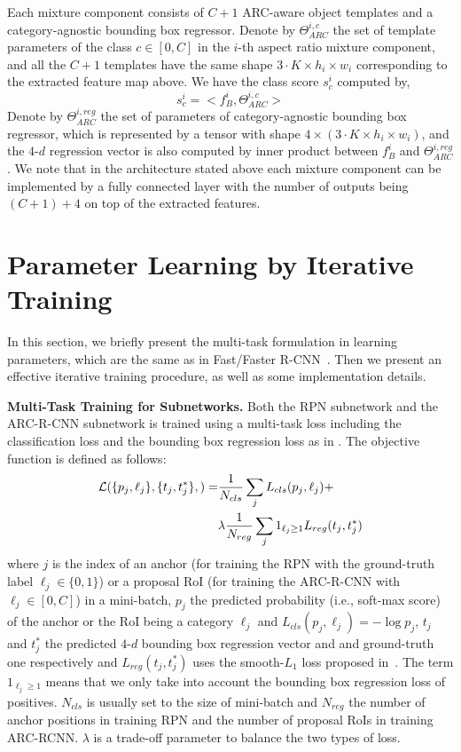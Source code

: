 \documentclass[10pt,twocolumn,letterpaper]{article}
\begin{document}
Each mixture component consists of $C+1$ ARC-aware object templates and a category-agnostic bounding box regressor.  Denote by $\Theta^{i,c}_{ARC}$ the set of template parameters of the class $c \in [0, C]$ in  the $i$-th aspect ratio mixture component, and all the $C+1$ templates have the same shape $3\cdot K \times h_i \times w_i$ corresponding to the extracted feature map above.  We have the class score $s_c^i$ computed by, 
\begin{equation}
s_c^i = <f^i_B, \Theta^{i,c}_{ARC}>
\end{equation}
Denote by $\Theta^{i, reg}_{ARC}$ the set of parameters of category-agnostic bounding box regressor, which is represented by a tensor with shape $4\times (3\cdot K \times h_i \times w_i)$, and the $4$-$d$ regression vector is also computed by inner product between $f^i_B$ and $\Theta^{i, reg}_{ARC}$. 
We note that in the architecture stated above each mixture component can be implemented by a fully connected layer with the number of outputs being $(C+1)+4$ on top of the extracted features. 


\vspace{-2mm}
\section{Parameter Learning by Iterative Training\label{sec:training}}
\vspace{-1mm}

In this section, we briefly present the multi-task formulation in learning parameters, which are the same as in Fast/Faster R-CNN~\cite{fast_rcnn,faster_rcnn}.  Then we present an effective iterative training procedure, as well as some implementation details.

\textbf{Multi-Task Training for Subnetworks.}
Both the RPN subnetwork and the ARC-R-CNN subnetwork is trained using a multi-task loss including the classification loss and the bounding box regression loss as in \cite{fast_rcnn,faster_rcnn}. The objective function is defined as follows:
\begin{align}
\nonumber \mathcal{L}(\{p_j, \ell_j\}, \{t_j, t_j^*\},) = &{1\over N_{cls}}\sum_j L_{cls}(p_j, \ell_j) + \\
& \lambda {1\over N_{reg}}\sum_j 1_{\ell_j\geq 1}L_{reg}(t_j, t_j^*)
\end{align}
where $j$ is the index of an anchor (for training the RPN with the ground-truth label $\ell_j\in\{0, 1\}$) or a proposal RoI (for training the ARC-R-CNN with $\ell_j\in [0, C]$) in a mini-batch, $p_j$ the predicted probability (i.e., soft-max score) of the anchor or the RoI being a category $\ell_j$ and $L_{cls}(p_j, \ell_j)=-\log p_j$, $t_j$ and $t_j^*$ the predicted  $4$-$d$ bounding box regression vector and and ground-truth one respectively and $L_{reg}(t_j, t_j^*)$ uses the smooth-$L_1$ loss proposed in~\cite{fast_rcnn}.  The term $1_{\ell_j\geq 1}$ means that we only take into account the bounding box regression loss of positives. $N_{cls}$ is usually set to the size of mini-batch and $N_{reg}$ the number of anchor positions in training RPN and the number of proposal RoIs in training ARC-RCNN. $\lambda$ is a trade-off parameter to balance the two types of loss.
\end{document}

